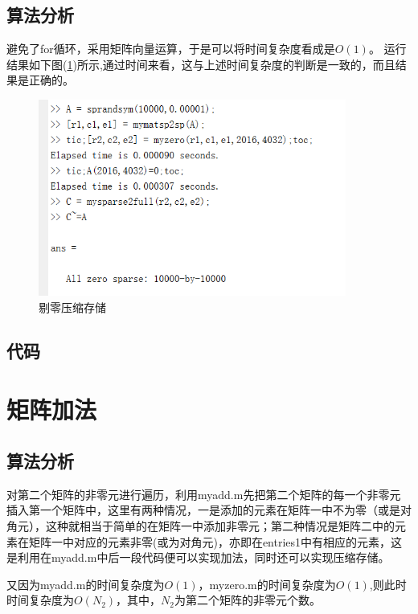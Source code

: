 \documentclass[a4paper,left=2.5cm,right=2.5cm]{article}
\begin{document}
\begin{spacing}{1.6}
		\subsection{算法分析}
		避免了for循环，采用矩阵向量运算，于是可以将时间复杂度看成是$O(1)$。
		运行结果如下图(\ref{zero})所示,通过时间来看，这与上述时间复杂度的判断是一致的，而且结果是正确的。
		\begin{figure}[H]
			\includegraphics[width=0.9\textwidth]{image/zero.png}
			\caption{剔零压缩存储}
			\label{zero}
		\end{figure}
		\subsection{代码}
		
		\section{矩阵加法}
		\subsection{算法分析}
		对第二个矩阵的非零元进行遍历，利用myadd.m先把第二个矩阵的每一个非零元插入第一个矩阵中，这里有两种情况，一是添加的元素在矩阵一中不为零（或是对角元），这种就相当于简单的在矩阵一中添加非零元；第二种情况是矩阵二中的元素在矩阵一中对应的元素非零(或为对角元)，亦即在entries1中有相应的元素，这是利用在myadd.m中后一段代码便可以实现加法，同时还可以实现压缩存储。
		
		又因为myadd.m的时间复杂度为$O(1)$，myzero.m的时间复杂度为$O(1)$,则此时时间复杂度为$O(N_2)$，其中，$N_2$为第二个矩阵的非零元个数。
		

\end{spacing}
\end{document}
